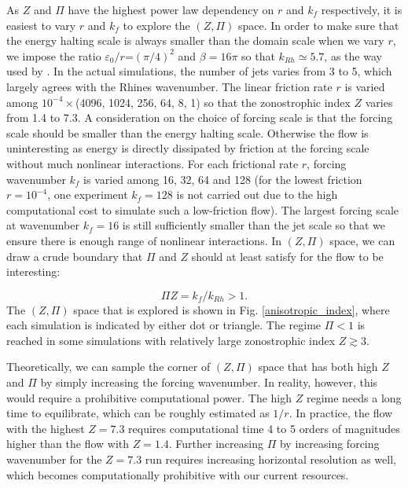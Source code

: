 \documentclass{ametsoc}
\begin{document}
As $Z$ and $\Pi$ have the highest power law dependency on $r$ and
$k_{f}$ respectively, it is easiest to vary $r$ and $k_{f}$ to
explore the $(Z,\Pi)$ space. In order to make sure that the energy halting
scale is always smaller than the domain scale when we vary $r$, we impose
the ratio $\varepsilon_{0}/r$=$(\pi/4)^{2}$ and $\beta=16\pi$ so
that $k_{Rh}\simeq5.7$, as the way used by \citet{Scott2012}. In
the actual simulations, the number of jets varies from 3 to 5, which
largely agrees with the Rhines wavenumber. The linear friction rate
$r$ is varied among $10^{-4}\times$(4096, 1024, 256, 64, 8, 1) so
that the zonostrophic index $Z$ varies from 1.4 to 7.3. A consideration
on the choice of forcing scale is that the forcing scale should be
smaller than the energy halting scale. Otherwise the flow is
uninteresting as energy is directly dissipated by friction at the
forcing scale without much nonlinear interactions. For each frictional
rate $r$, forcing wavenumber $k_{f}$ is varied among 16, 32, 64
and 128 (for the lowest friction $r=10^{-4}$, one experiment $k_{f}=128$
is not carried out due to the high computational cost to simulate
such a low-friction flow). The largest forcing scale at wavenumber $k_{f}=16$ is
still sufficiently smaller than the jet scale so that we ensure there
is enough range of nonlinear interactions. In $(Z,\Pi)$ space, we
can draw a crude boundary that $\Pi$ and $Z$ should at least satisfy
for the flow to be interesting:

\begin{equation}
\Pi Z=k_{f}/k_{Rh}>1.\label{eq:PIxZ>1}
\end{equation}
The $(Z,\Pi)$ space that is explored is shown in Fig. \ref{anisotropic_index},
where each simulation is indicated by either dot or triangle. The
regime $\Pi<1$ is reached in some simulations with relatively large
zonostrophic index $Z\apprge3$. 

Theoretically, we can sample the corner of $(Z,\Pi)$ space that has
both high $Z$ and $\Pi$ by simply increasing the forcing wavenumber.
In reality, however, this would require a prohibitive computational
power. The high $Z$ regime needs a long time to equilibrate, which
can be roughly estimated as $1/r$. In practice, the flow with the
highest $Z=7.3$ requires computational time 4 to 5 orders of magnitudes
higher than the flow with $Z=1.4$. Further increasing $\Pi$ by increasing
forcing wavenumber for the $Z=7.3$ run requires increasing horizontal
resolution as well, which becomes computationally prohibitive with
our current resources.
\end{document}
